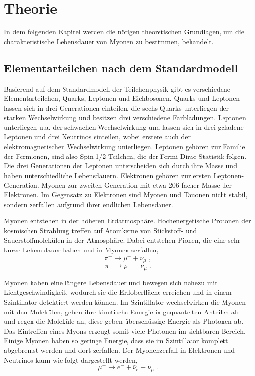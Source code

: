 \section{Theorie}

In dem folgenden Kapitel werden die nötigen theoretischen Grundlagen, um die charakteristische Lebensdauer von Myonen zu bestimmen, behandelt.

\subsection{Elementarteilchen nach dem Standardmodell}

Basierend auf dem Standardmodell der Teilchenphysik gibt es verschiedene Elementarteilchen, Quarks, Leptonen und Eichbosonen. Quarks und Leptonen lassen sich in drei Generationen einteilen, die sechs Quarks unterliegen der starken Wechselwirkung und besitzen drei verschiedene Farbladungen. Leptonen unterliegen u.a. der schwachen Wechselwirkung und lassen sich in drei geladene Leptonen und drei Neutrinos einteilen, wobei erstere auch der elektromagnetischen Wechselwirkung unterliegen. Leptonen gehören zur Familie der Fermionen, sind also Spin-1/2-Teilchen, die der Fermi-Dirac-Statistik folgen. Die drei Generationen der Leptonen unterscheiden sich durch ihre Masse und haben unterschiedliche Lebensdauern. Elektronen gehören zur ersten Leptonen-Generation, Myonen zur zweiten Generation mit etwa 206-facher Masse der Elektronen. Im Gegensatz zu Elektronen sind Myonen und Tauonen nicht stabil, sondern zerfallen aufgrund ihrer endlichen Lebensdauer.

Myonen entstehen in der höheren Erdatmosphäre. Hochenergetische Protonen der kosmischen Strahlung treffen auf Atomkerne von Stickstoff- und Sauerstoffmolekülen in der Atmosphäre. Dabei entstehen Pionen, die eine sehr kurze Lebensdauer haben und in Myonen zerfallen, $$\pi^+ \rightarrow \mu^+ + \nu_\mu\; ,$$ $$\pi^- \rightarrow \mu^- + \bar{\nu}_\mu\; .$$

Myonen haben eine längere Lebensdauer und bewegen sich nahezu mit Lichtgeschwindigkeit, wodurch sie die Erdoberfläche erreichen und in einem Szintillator detektiert werden können. Im Szintillator wechselwirken die Myonen mit den Molekülen, geben ihre kinetische Energie in gequantelten Anteilen ab und regen die Moleküle an, diese geben überschüssige Energie als Photonen ab. Das Eintreffen eines Myons erzeugt somit viele Photonen im sichtbaren Bereich. Einige Myonen haben so geringe Energie, dass sie im Szintillator komplett abgebremst werden und dort zerfallen. Der Myonenzerfall in Elektronen und Neutrinos kann wie folgt dargestellt werden, $$\mu^- \rightarrow e^- + \bar{\nu}_e + \nu_\mu\; . $$

